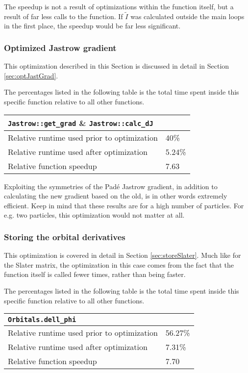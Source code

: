 The speedup is not a result of optimizations within the function itself, but a result of far less calls to the function. If $\tilde I$ was calculated outside the main loops in the first place, the speedup would be far less significant. 


\subsubsection{Optimized Jastrow gradient}

This optimization described in this Section is discussed in detail in Section \ref{sec:optJastGrad}.

The percentages listed in the following table is the total time spent inside this specific function relative to all other functions. 

\begin{tabular}{ll}
 \verb+Jastrow::get_grad+ \& \verb+Jastrow::calc_dJ+ & \\
 \hline\hline
 Relative runtime used prior to optimization & 40\% \\
 Relative runtime used after optimization    & 5.24\% \\
 \hline
 Relative function speedup                   & 7.63
\end{tabular}

Exploiting the symmetries of the Padé Jastrow gradient, in addition to calculating the new gradient based on the old, is in other words extremely efficient. Keep in mind that these results are for a high number of particles. For e.g. two particles, this optimization would not matter at all.

\subsubsection{Storing the orbital derivatives}

This optimization is covered in detail in Section \ref{sec:storeSlater}. Much like for the Slater matrix, the optimization in this case comes from the fact that the function itself is called fewer times, rather than being faster.

The percentages listed in the following table is the total time spent inside this specific function relative to all other functions. 


\begin{tabular}{ll}
 \verb+Orbitals.dell_phi+ & \\
 \hline\hline
 Relative runtime used prior to optimization & 56.27\% \\
 Relative runtime used after optimization    & 7.31\% \\
 \hline
 Relative function speedup                   & 7.70
\end{tabular}



